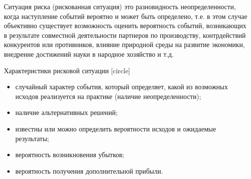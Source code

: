 \documentclass[_fin_decisions_lectures.tex]{subfiles}
\begin{document}
\begin{frame}{}
  \begin{block}{Ситуация риска (рискованная ситуация)}
  это разновидность неопределенности, когда наступление событий вероятно и может быть определено, т.е. в этом случае объективно существует возможность оценить вероятность событий, возникающих в результате совместной деятельности партнеров по производству, контрдействий конкурентов или противников, влияние природной среды на развитие экономики, внедрение достижений науки в народное хозяйство и т.д.
  \end{block}
\end{frame}

\begin{frame}{Характеристики рисковой ситуации}
[circle]
  	\begin{itemize}[<+->]
	  \item
		случайный характер события, который определяет, какой из возможных исходов реализуется на практике (наличие неопределенности);
	  \item
		наличие альтернативных решений;
	  \item
		известны или можно определить вероятности исходов и ожидаемые результаты;
	  \item
		вероятность возникновения убытков;
	  \item
		вероятность получения дополнительной прибыли.
  \end{itemize}
\end{frame}
\end{document}
